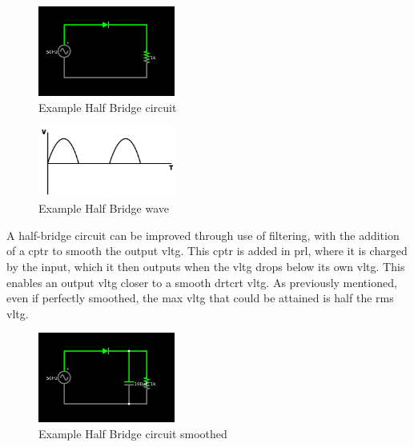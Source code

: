 \documentclass[a4paper,11pt]{report}
\begin{document}
\vspace*{1\baselineskip}

\begin{figure}[H]
\centering
\includegraphics[width=0.4\textwidth]{halfbridge}
\caption{Example Half Bridge circuit}
\end{figure}

\begin{figure}[H]
\centering
\includegraphics[width=0.4\textwidth]{halfbridgewave}
\caption{Example Half Bridge wave}
\end{figure}

\vspace*{1\baselineskip}

A half-bridge circuit can be improved through use of filtering, with the addition of a \gls{cptr} to smooth the output \gls{vltg}. This \gls{cptr} is added in \gls{prl}, where it is charged by the input, which it then outputs when the \gls{vltg} drops below its own \gls{vltg}. This enables an output \gls{vltg} closer to a smooth \gls{drtcrt} \gls{vltg}. As previously mentioned, even if perfectly smoothed, the max \gls{vltg} that could be attained is half the \gls{rms} \gls{vltg}.

\vspace*{1\baselineskip}

\begin{figure}[H]
\centering
\includegraphics[width=0.4\textwidth]{halfbridgesmoothed}
\caption{Example Half Bridge circuit smoothed}
\end{figure}
\end{document}
